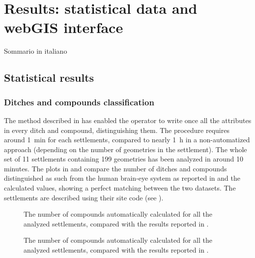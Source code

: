 \chapter{Results: statistical data and webGIS interface}

    \vspace{0.06\textheight}
    \begin{chaptersum}
        Sommario in italiano
    \end{chaptersum}

    \section{Statistical results}
        \subsection{Ditches and compounds classification}
            The method described in  has enabled the operator to write once all the attributes in every ditch and compound, distinguishing them. The procedure requires around \SI{1}{\minute} for each settlements, compared to nearly \SI{1}{\hour} in a non-automatized approach (depending on the number of geometries in the settlement). The whole set of 11 settlements containing 199 geometries has been analyzed in around 10 minutes. The plots in  and  compare the number of ditches and compounds distinguished as such from the human brain-eye system as reported in \cite{laterza} and the calculated values, showing a perfect matching between the two datasets. The settlements are described using their site code (see ).

            \begin{figure}[H]
                \centering
                \begin{tikzpicture}
                    
                \end{tikzpicture}
                \caption[The number of compounds in \cite{laterza} compared to the results of the proposed method.]{The number of compounds automatically calculated for all the analyzed settlements, compared with the results reported in \cite{laterza}.}
                \label{fig:graph-num-compound}
            \end{figure}

            \begin{figure}[H]
                \centering
                \begin{tikzpicture}
                    
                \end{tikzpicture}
                \caption[The number of ditches in \cite{laterza} compared to the results of the proposed method.]{The number of compounds automatically calculated for all the analyzed settlements, compared with the results reported in \cite{laterza}.}
                \label{fig:graph-num-ditch}
            \end{figure}

